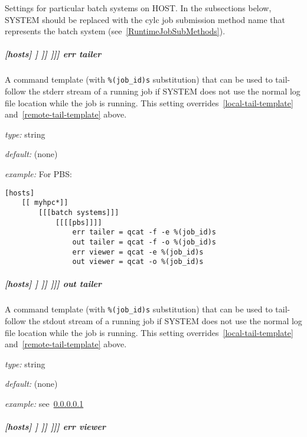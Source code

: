 Settings for particular batch systems on HOST. In the subsections below, SYSTEM
should be replaced with the cylc job submission method name that represents the
batch system (see~\ref{RuntimeJobSubMethods}).

\subparagraph[{[[[[}SYSTEM{]]]]}err tailer]{[hosts] \textrightarrow [[HOST]] \textrightarrow [[[batch systems]]] \textrightarrow [[[[SYSTEM]]]] \textrightarrow err tailer}
\label{err-tailer}

A command template (with \lstinline=%(job_id)s= substitution) that can be used
to tail-follow the stderr stream of a running job if SYSTEM does
not use the normal log file location while the job is running.  This setting
overrides~\ref{local-tail-template} and~\ref{remote-tail-template} above.

\begin{myitemize}
\item {\em type:} string
\item {\em default:} (none)
\item {\em example:} For PBS:
    \begin{lstlisting}
[hosts]
    [[ myhpc*]]
        [[[batch systems]]]
            [[[[pbs]]]]
                err tailer = qcat -f -e %(job_id)s
                out tailer = qcat -f -o %(job_id)s
                err viewer = qcat -e %(job_id)s
                out viewer = qcat -o %(job_id)s
    \end{lstlisting}
\end{myitemize}

\subparagraph[{[[[[}SYSTEM{]]]]}out tailer]{[hosts] \textrightarrow [[HOST]] \textrightarrow [[[batch systems]]] \textrightarrow [[[[SYSTEM]]]] \textrightarrow out tailer}
\label{out-tailer}

A command template (with \lstinline=%(job_id)s= substitution) that can be used
to tail-follow the stdout stream of a running job if SYSTEM does
not use the normal log file location while the job is running.  This setting
overrides~\ref{local-tail-template} and~\ref{remote-tail-template} above.

\begin{myitemize}
\item {\em type:} string
\item {\em default:} (none)
\item {\em example:} see~\ref{err-tailer}
\end{myitemize}

\subparagraph[{[[[[}SYSTEM{]]]]}err viewer]{[hosts] \textrightarrow [[HOST]] \textrightarrow [[[batch systems]]] \textrightarrow [[[[SYSTEM]]]] \textrightarrow err viewer}

